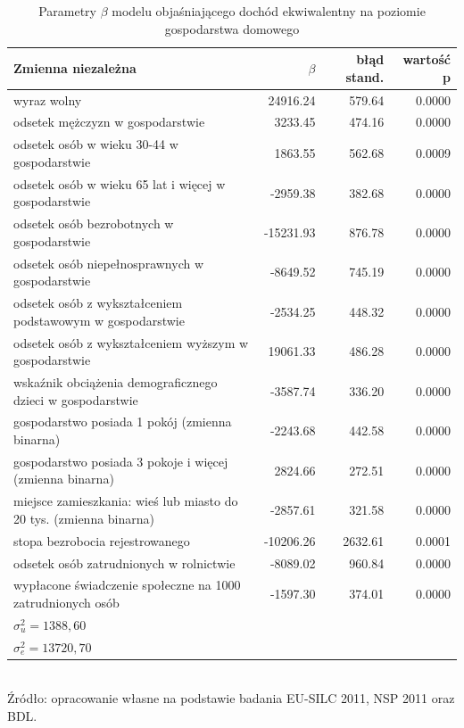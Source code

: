 \begin{table}[htp]
\centering
\caption{Parametry $\beta$ modelu objaśniającego dochód ekwiwalentny na poziomie gospodarstwa domowego}
\label{tab:jedn_beta}
\begin{tabular}{p{10cm}rrr}
\hline
Zmienna niezależna & $\beta$ & błąd stand. & wartość p \\
\hline
wyraz wolny & 24916.24 & 579.64 & 0.0000 \\
odsetek mężczyzn w gospodarstwie & 3233.45 & 474.16 & 0.0000 \\
odsetek osób w wieku 30-44 w gospodarstwie & 1863.55 & 562.68 & 0.0009 \\
odsetek osób w wieku 65 lat i więcej w gospodarstwie & -2959.38 & 382.68 & 0.0000 \\
odsetek osób bezrobotnych w gospodarstwie & -15231.93 & 876.78 & 0.0000 \\
odsetek osób niepełnosprawnych w gospodarstwie & -8649.52 & 745.19 & 0.0000 \\
odsetek osób z wykształceniem podstawowym w gospodarstwie & -2534.25 & 448.32 & 0.0000 \\
odsetek osób z wykształceniem wyższym w gospodarstwie & 19061.33 & 486.28 & 0.0000 \\
wskaźnik obciążenia demograficznego dzieci w gospodarstwie & -3587.74 & 336.20 & 0.0000 \\
gospodarstwo posiada 1 pokój (zmienna binarna) & -2243.68 & 442.58 & 0.0000 \\
gospodarstwo posiada 3 pokoje i więcej (zmienna binarna) & 2824.66 & 272.51 & 0.0000 \\
miejsce zamieszkania: wieś lub miasto do 20 tys. (zmienna binarna) & -2857.61 & 321.58 & 0.0000 \\
\hline
stopa bezrobocia rejestrowanego & -10206.26 & 2632.61 & 0.0001 \\
odsetek osób zatrudnionych w rolnictwie & -8089.02 & 960.84 & 0.0000 \\
wypłacone świadczenie społeczne na 1000 zatrudnionych osób & -1597.30 & 374.01 & 0.0000 \\
\hline
$\sigma_u^2=1388,60$ & & & \\
$\sigma_e^2=13720,70$ & & & \\
\hline
\end{tabular}\\
\small{Źródło: opracowanie własne na podstawie badania EU-SILC 2011, NSP 2011 oraz BDL.}
\end{table}

